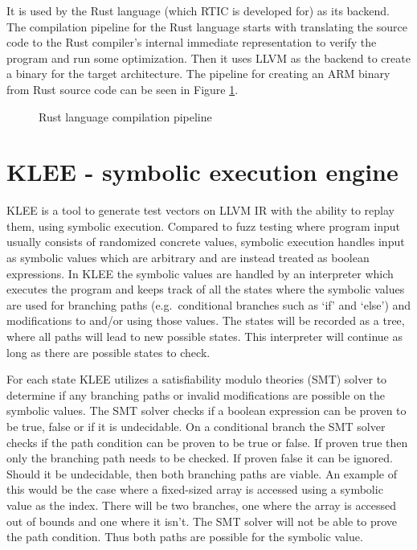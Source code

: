 It is used by the Rust language (which RTIC is developed for) as its backend.
The compilation pipeline for the Rust language starts with translating the
source code to the Rust compiler's internal immediate representation to
verify the program and run some optimization. Then it uses LLVM as the backend
to create a binary for the target architecture. The pipeline for creating an
ARM binary from Rust source code can be seen in Figure
\ref{figure:rustcompilation}.
\begin{figure}[h]
    \centering
    \caption{Rust language compilation pipeline}
    \label{figure:rustcompilation}
\end{figure}


\section{KLEE - symbolic execution engine}
KLEE\cite{kleepaper} is a tool to generate test vectors on LLVM IR with the
ability to replay them, using symbolic execution. Compared to fuzz testing
where program input usually consists of randomized concrete values, symbolic
execution handles input as symbolic values which are arbitrary and are instead
treated as boolean expressions. In KLEE the symbolic values are handled by an
interpreter which executes the program and keeps track of all the states where
the symbolic values are used for branching paths (e.g.\ conditional branches
such as `if' and `else') and modifications to and/or using those values. The
states will be recorded as a tree, where all paths will lead to new possible
states.  This interpreter will continue as long as there are possible states to
check.

For each state KLEE utilizes a satisfiability modulo theories (SMT) solver to
determine if any branching paths or invalid modifications are possible on the
symbolic values. The SMT solver checks if a boolean expression can be proven to
be true, false or if it is undecidable. On a conditional branch the SMT solver
checks if the path condition can be proven to be true or false. If proven true
then only the branching path needs to be checked. If proven false it can be
ignored. Should it be undecidable, then both branching paths are viable. An
example of this would be the case where a fixed-sized array is accessed using a
symbolic value as the index. There will be two branches, one where the array is
accessed out of bounds and one where it isn't. The SMT solver will not be able
to prove the path condition. Thus both paths are possible for the symbolic
value.

